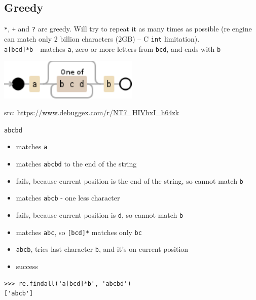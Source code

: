\documentclass{beamer}
\begin{document}
\subsection{Greedy}
\begin{frame}[fragile]
\verb/*/, \verb/+/ and \verb/?/ are greedy. Will try to repeat it as many times as possible (re engine can match only 2 billion characters (2GB) -- C \verb/int/ limitation). \\
\pause
\verb/a[bcd]*b/ - matches \verb/a/, zero or more letters from \verb/bcd/, and ends with \verb/b/ \\
\begin{center}
\includegraphics[width=0.5\textwidth]{images/greedy.png}
\end{center}
src: \url{https://www.debuggex.com/r/NT7_HIVhxI_h64zk}
\end{frame}

\begin{frame}[fragile]
\verb/abcbd/
\begin{itemize}
\item matches \verb/a/
\pause
\item matches \verb/abcbd/ to the end of the string
\pause
\item fails, because current position is the end of the string, so cannot match \verb/b/
\pause
\item matches \verb/abcb/ - one less character
\pause
\item fails, because current position is \verb/d/, so cannot match \verb/b/
\pause
\item matches \verb/abc/, so \verb/[bcd]*/ matches only \verb/bc/
\pause
\item \verb/abcb/, tries last character \verb/b/, and it's on current position
\pause
\item success
\end{itemize}
\begin{lstlisting}
>>> re.findall('a[bcd]*b', 'abcbd')
['abcb']
\end{lstlisting}
\end{frame}
\end{document}
